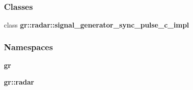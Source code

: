 \subsubsection*{Classes}
\begin{DoxyCompactItemize}
\item 
class {\bf gr\+::radar\+::signal\+\_\+generator\+\_\+sync\+\_\+pulse\+\_\+c\+\_\+impl}
\end{DoxyCompactItemize}
\subsubsection*{Namespaces}
\begin{DoxyCompactItemize}
\item 
 {\bf gr}
\item 
 {\bf gr\+::radar}
\end{DoxyCompactItemize}
